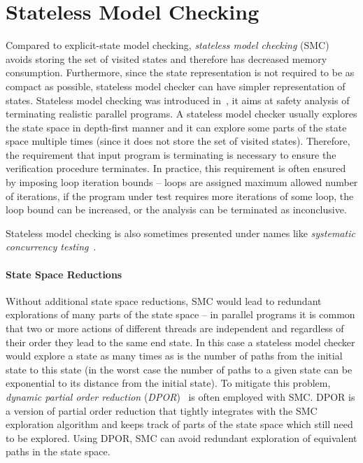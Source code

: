 
\section{Stateless Model Checking}

Compared to explicit-state model checking, \emph{stateless model checking}
(SMC) avoids storing the set of visited states and therefore has decreased
memory consumption.
Furthermore, since the state representation is not required to be as compact as
possible, stateless model checker can have simpler representation of states.
Stateless model checking was introduced in~, it aims at
safety analysis of terminating realistic parallel programs.
A stateless model checker usually explores the state space in depth-first
manner and it can explore some parts of the state space multiple times (since
it does not store the set of visited states).
Therefore, the requirement that input program is terminating is necessary to
ensure the verification procedure terminates.
In practice, this requirement is often ensured by imposing loop iteration
bounds -- loops are assigned maximum allowed number of iterations, if the
program under test requires more iterations of some loop, the loop bound can be
increased, or the analysis can be terminated as inconclusive.

Stateless model checking is also sometimes presented under names like \emph{systematic concurrency testing}~.

\paragraph{State Space Reductions}

Without additional state space reductions, SMC would lead to redundant
explorations of many parts of the state space -- in parallel programs it is
common that two or more actions of different threads are independent and
regardless of their order they lead to the same end state.
In this case a stateless model checker would explore a state as many times as
is the number of paths from the initial state to this state (in the worst case
the number of paths to a given state can be exponential to its distance from
the initial state).
To mitigate this problem, \emph{dynamic partial order reduction}
(\emph{DPOR})~ is often employed with SMC.
DPOR is a version of partial order reduction that tightly integrates with
the SMC exploration algorithm and keeps track of parts of the state space which
still need to be explored.
Using DPOR, SMC can avoid redundant exploration of equivalent paths in the
state space.


